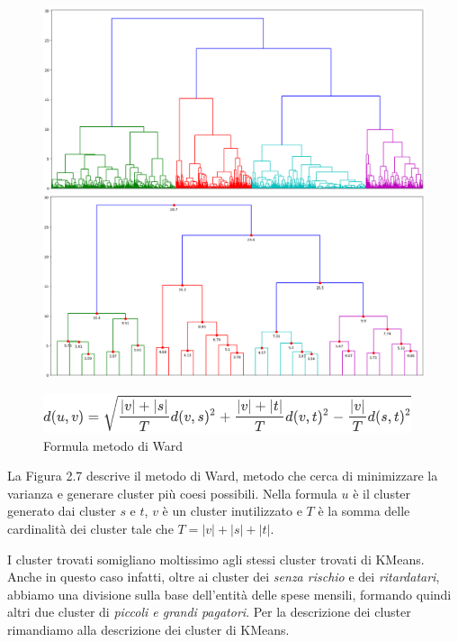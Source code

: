 \begin{figure}[!htb]
  \includegraphics[width=\linewidth]{img/euclidean-ward.png}
  \caption{}\label{euward}
\endminipage\hfill
{}
  \includegraphics[width=\linewidth]{img/euclidean-ward-truncate.png}
  \caption{}\label{euwardtrunc}
\endminipage\hfill
\end{figure}

\begin{figure}[H]
\includegraphics[width=0.5\linewidth]{img/ward_linkage.png}
\centering
\caption{Formula metodo di Ward}
\label{dendro-complete}
\end{figure} 

La Figura 2.7 descrive il metodo di Ward, metodo che cerca di minimizzare la varianza e generare cluster pi\`u coesi possibili. Nella formula $u$ \`e il cluster generato dai cluster $s$ e $t$, $v$ \`e un cluster inutilizzato e $T$ \`e la somma delle cardinalità dei cluster tale che $T = |v| + |s| + |t|$.

I cluster trovati somigliano moltissimo agli stessi cluster trovati di KMeans.
Anche in questo caso infatti, oltre ai cluster dei \textit{senza rischio} e
dei \textit{ritardatari}, abbiamo una divisione sulla base dell'entit\`a delle spese
mensili, formando quindi altri due cluster di \textit{piccoli e grandi pagatori}.
Per la descrizione dei cluster rimandiamo alla descrizione dei cluster di KMeans.

